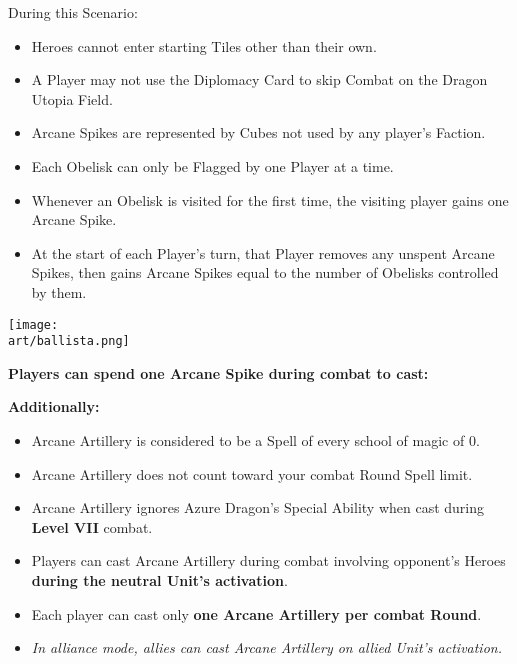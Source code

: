 \begin{multicols}{2}
During this Scenario:

\begin{itemize}
  \item Heroes cannot enter starting Tiles other than their own.
  \item A Player may not use the Diplomacy Card to skip Combat on the Dragon Utopia Field.
  \item Arcane Spikes are represented by Cubes not used by any player's Faction.
  \item Each Obelisk can only be Flagged by one Player at a time.
  \item Whenever an Obelisk is visited for the first time, the visiting player gains one Arcane Spike.
  \item At the start of each Player's turn, that Player removes any unspent Arcane Spikes, then gains Arcane Spikes equal to the number of Obelisks controlled by them.
\end{itemize}

\vspace{3em}

\texttt{[image: \\art/ballista.png]}

\textbf{Players can spend one Arcane Spike during combat to cast:}


\textbf{Additionally:}

\begin{itemize}
  \item Arcane Artillery is considered to be a Spell of every school of magic of  0.
  \item Arcane Artillery does not count toward your combat Round Spell limit.
  \item Arcane Artillery ignores Azure Dragon's Special Ability when cast during \textbf{Level VII} combat.
  \item Players can cast Arcane Artillery during combat involving opponent's Heroes \textbf{during the neutral Unit's activation}.
  \item Each player can cast only \textbf{one Arcane Artillery per combat Round}.
  \item \textit{In alliance mode, allies can cast Arcane Artillery on allied Unit's activation.}
\end{itemize}


\end{multicols}
